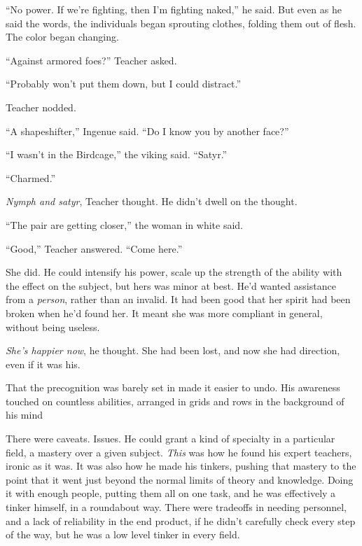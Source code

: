 ``No power.  If we're fighting, then I'm fighting naked,'' he said.  But even as he said the words, the individuals began sprouting clothes, folding them out of flesh.  The color began changing.



``Against armored foes?''  Teacher asked.



``Probably won't put them down, but I could distract.''



Teacher nodded.



``A shapeshifter,'' Ingenue said.  ``Do I know you by another face?''



``I wasn't in the Birdcage,'' the viking said.  ``Satyr.''



``Charmed.''



\emph{Nymph and satyr}, Teacher thought.  He didn't dwell on the thought.



``The pair are getting closer,'' the woman in white said.



``Good,'' Teacher answered.  ``Come here.''



She did.  He could intensify his power, scale up the strength of the ability with the effect on the subject, but hers was minor at best.  He'd wanted assistance from a \emph{person}, rather than an invalid.  It had been good that her spirit had been broken when he'd found her.  It meant she was more compliant in general, without being useless.



\emph{She's happier now}, he thought.  She had been lost, and now she had direction, even if it was his.



That the precognition was barely set in made it easier to undo.  His awareness touched on countless abilities, arranged in grids and rows in the background of his mind



There were caveats.  Issues.  He could grant a kind of specialty in a particular field, a mastery over a given subject.  \emph{This} was how he found his expert teachers, ironic as it was. It was also how he made his tinkers, pushing that mastery to the point that it went just beyond the normal limits of theory and knowledge.  Doing it with enough people, putting them all on one task, and he was effectively a tinker himself, in a roundabout way.  There were tradeoffs in needing personnel, and a lack of reliability in the end product, if he didn't carefully check every step of the way, but he was a low level tinker in every field.



